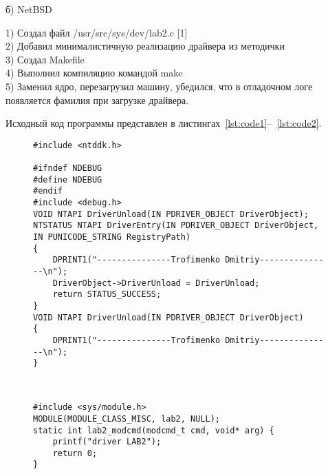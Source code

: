 \documentclass[a4paper, 14pt]{extarticle}
\begin{document}
\begin{center}
б) NetBSD
\end{center}
1) Создал файл /usr/src/sys/dev/lab2.c [1]\\
2) Добавил минималистичную реализацию драйвера из методички\\
3) Создал Makefile\\
4) Выполнил компиляцию командой make\\
5) Заменил ядро, перезагрузил машину, убедился, что в отладочном логе
появляется фамилия при загрузке драйвера.\\

\newpage

Исходный код программы представлен в листингах~\ref{lst:code1}--~\ref{lst:code2}.
\begin{figure}[!htb]
\begin{lstlisting}[language={},caption={
lab2driver.c (ReactOS).},label={lst:code1}]
#include <ntddk.h>

#ifndef NDEBUG
#define NDEBUG
#endif
#include <debug.h>
VOID NTAPI DriverUnload(IN PDRIVER_OBJECT DriverObject);
NTSTATUS NTAPI DriverEntry(IN PDRIVER_OBJECT DriverObject, IN PUNICODE_STRING RegistryPath)
{
    DPRINT1("---------------Trofimenko Dmitriy---------------\n");
    DriverObject->DriverUnload = DriverUnload;
    return STATUS_SUCCESS;
}
VOID NTAPI DriverUnload(IN PDRIVER_OBJECT DriverObject)
{
    DPRINT1("---------------Trofimenko Dmitriy---------------\n");
}



\end{lstlisting}
\end{figure}

\begin{figure}[!htb]
\begin{lstlisting}[language={},caption={
lab2.c (NetBSD).},label={lst:code2}]
#include <sys/module.h>
MODULE(MODULE_CLASS_MISC, lab2, NULL);
static int lab2_modcmd(modcmd_t cmd, void* arg) {
    printf("driver LAB2");
    return 0;
}


\end{lstlisting}
\end{figure}
\end{document}
